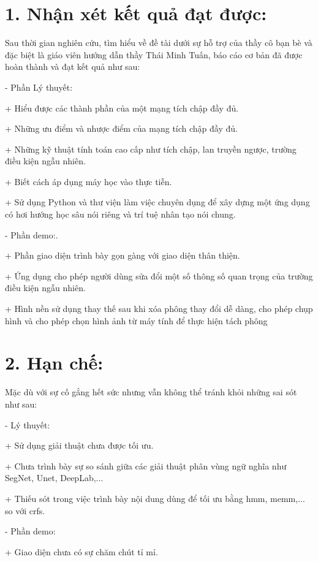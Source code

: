\documentclass[../the.tex]{subfiles}
\begin{document}
\section*{1. Nhận xét kết quả đạt được:}
\label{comment}
Sau thời gian nghiên cứu, tìm hiểu về đề tài dưới sự hỗ trợ của thầy cô bạn bè và đặc biệt là giáo viên hướng dẫn thầy Thái Minh Tuấn, báo cáo cơ bản đã được hoàn thành và đạt kết quả như sau:
\bigskip

-	Phần Lý thuyết:

	+ Hiểu được các thành phần của một mạng tích chập đầy đủ.
	
	+ Những ưu điểm và nhược điểm của mạng tích chập đầy đủ.
	
	+ Những kỹ thuật tính toán cao cấp như tích chập, lan truyền ngược, trường điều kiện ngẫu nhiên.
	
	+ Biết cách áp dụng máy học vào thực tiễn.
	
	+ Sử dụng Python và thư viện làm việc chuyên dụng để xây dựng một ứng dụng có hơi hướng học sâu nói riêng và trí tuệ nhân tạo nói chung.
	
\bigskip

-	Phần demo:.

	+ Phần giao diện trình bày gọn gàng với giao diện thân thiện.
	
	+ Ứng dụng cho phép người dùng sửa đổi một số thông số quan trọng của trường điều kiện ngẫu nhiên.
	
	+ Hình nền sử dụng thay thế sau khi xóa phông thay đổi dễ dàng, cho phép chụp hình và cho phép chọn hình ảnh từ máy tính để thực hiện tách phông
	
\bigskip



\section*{2. Hạn chế:}
\label{limit}
Mặc dù với sự cố gắng hết sức nhưng vẫn không thể tránh khỏi những sai sót như sau:

-	Lý thuyết:

	+ Sử dụng giải thuật chưa được tối ưu.
	
	+ Chưa trình bày sự so sánh giữa các giải thuật phân vùng ngữ nghĩa như SegNet, Unet, DeepLab,...
	
	+ Thiếu sót trong việc trình bày nội dung dùng để tối ưu bằng \gls{hmm}, \gls{memm},... so với \gls{crfs}.
\bigskip
	

-	Phần demo: 

	+ Giao diện chưa có sự chăm chút tỉ mỉ.
	
\end{document}
